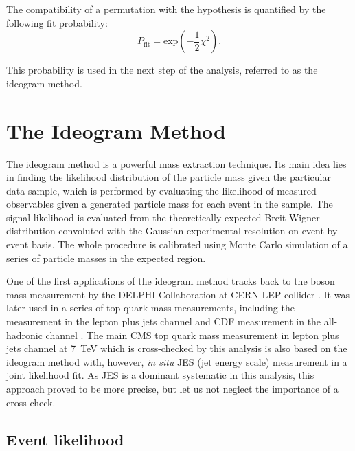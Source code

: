 The compatibility of a permutation with the \ttbar hypothesis is quantified by the following fit probability:
\begin{equation}
	P_{\textrm{fit}} = \textrm{exp}(-\frac{1}{2}\chi^2).
	\label{eq:fit_probability}
\end{equation}

This probability is used in the next step of the analysis, referred to as the ideogram method.

\clearpage
\section{The Ideogram Method}
\label{s_top_mass:ideogram_method}

The ideogram method is a powerful mass extraction technique. Its main idea lies in finding the likelihood distribution
of the particle mass given the particular data sample, which is performed by evaluating the likelihood of measured
observables given a generated particle mass for each event in the sample. The signal likelihood is evaluated from the
theoretically expected Breit-Wigner distribution convoluted with the Gaussian experimental resolution on event-by-event
basis. The whole procedure is calibrated using Monte Carlo simulation of a series of particle masses in the expected
region.


One of the first applications of the ideogram method tracks back to the \W boson mass measurement by the \textsc{DELPHI}
Collaboration at CERN LEP collider \autocite{DELPHI_1998, DELPHI_2008}. It was later used in a series of top quark mass
measurements, including the \Dzero measurement in the lepton plus jets channel \autocite{D0_top_mass_ljets_ideogram} and
CDF measurement in the all-hadronic channel \autocite{CDF_ideogram}. The main CMS top quark mass measurement in lepton
plus jets channel at \SI{7}{\TeV} \autocite{top_mass_ljets_CMS} which is cross-checked by this analysis is also based on
the ideogram method with, however, \textit{in situ} JES (jet energy scale) measurement in a joint likelihood fit. As JES
is a dominant systematic in this analysis, this approach proved to be more precise, but let us not neglect the
importance of a cross-check.

\subsection{Event likelihood}
\label{ss_top_mass:event_likelihood}

